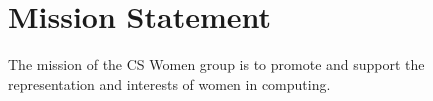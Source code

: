 \section{Mission Statement}
\label{sec:mission}
The mission of the CS Women group is to promote and support the representation and interests of women in computing.
